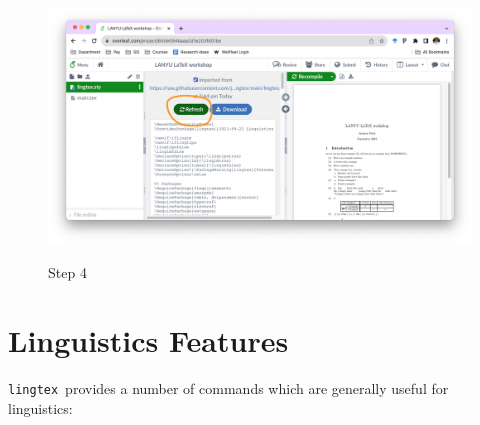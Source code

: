 \documentclass{article}
\def\lingtex{\texttt{lingtex}}
\begin{document}
\begin{figure}[htb!]
{\begin{floatrow}
            \ffigbox[\linewidth]
              {
              \label{subfig:step-4}}
              {\includegraphics[width=\linewidth]{images/step-4.png}\caption{Step 4}}
            \end{floatrow}%
      }
      {\label{fig:steps}}
\end{figure}

\section{Linguistics Features} \label{sec:linguistics-features}

\lingtex\ provides a number of commands which are generally useful for linguistics:
\end{document}
